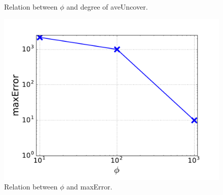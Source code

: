 \begin{figure}[!htb]
  \caption{Relation between $\phi$ and degree of aveUncover.}
  \label{fig:aveUncover}
\endminipage\hfill
{}%
  \includegraphics[width=\linewidth]{figure/maxError.pdf}
  \caption{Relation between $\phi$ and maxError.}
  \label{fig:maxError}

\endminipage
\end{figure}
